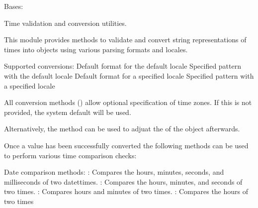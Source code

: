 \documentclass[letterpaper,10pt,english]{sphinxmanual}
\begin{document}
\begin{fulllineitems}
\label{\detokenize{apache_commons_validator_python.routines:apache_commons_validator_python.routines.time_validator.TimeValidator}}
\pysigstartsignatures
{}
\pysigstopsignatures
\sphinxAtStartPar
Bases: 

\sphinxAtStartPar
Time validation and conversion utilities.

\sphinxAtStartPar
This module provides methods to validate and convert string representations
of times into  objects using various parsing formats and locales.

\sphinxAtStartPar
Supported conversions:
\sphinxhyphen{} Default format for the default locale
\sphinxhyphen{} Specified pattern with the default locale
\sphinxhyphen{} Default format for a specified locale
\sphinxhyphen{} Specified pattern with a specified locale

\sphinxAtStartPar
All conversion methods () allow optional specification of time zones.
If this is not provided, the system default will be used.

\sphinxAtStartPar
Alternatively, the  method can be used to adjuat the 
of the  object afterwards.

\sphinxAtStartPar
Once a value has been successfully converted the following methods can be
used to perform various time comparison checks:

\sphinxAtStartPar
Date comparison methods:
\sphinxhyphen{} : Compares the hours, minutes, seconds, and milliseconds of two datettimes.
\sphinxhyphen{} : Compares the hours, minutes, and seconds of two times.
\sphinxhyphen{} : Compares hours and minutes of two times.
\sphinxhyphen{} : Compares the hours of two times


\end{fulllineitems}
\end{document}
